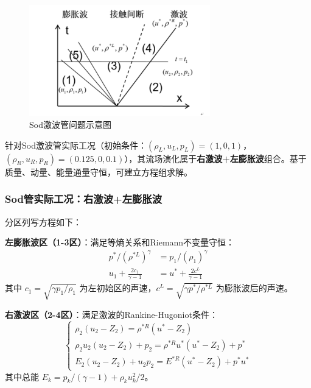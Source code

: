 \documentclass[12pt,a4paper]{article}
\begin{document}
\begin{figure}[H]
    \centering
    \includegraphics[width=0.7\textwidth]{sod_shock_tube.png}
    \caption{Sod激波管问题示意图}
    \label{fig:sod_shock_tube}
\end{figure}
针对Sod激波管实际工况（初始条件：$(\rho_L, u_L, p_L) = (1, 0, 1)$，$(\rho_R, u_R, p_R) = (0.125, 0, 0.1)$），其流场演化属于\textbf{右激波+左膨胀波}组合。基于质量、动量、能量通量守恒，可建立方程组求解。

\subsubsection{Sod管实际工况：右激波+左膨胀波}
分区列写方程如下：

\textbf{左膨胀波区（1-3区）}：满足等熵关系和Riemann不变量守恒：
\begin{align}
p^{*}/\left(\rho^{*L}\right)^{\gamma} &= p_{1}/\left(\rho_{1}\right)^{\gamma} \label{eq:isentropic} \\
u_{1} + \frac{2c_{1}}{\gamma-1} &= u^{*} + \frac{2c^{L}}{\gamma-1} \label{eq:riemann_inv}
\end{align}
其中 $c_{1} = \sqrt{\gamma p_{1}/\rho_{1}}$ 为左初始区的声速，$c^{L} = \sqrt{\gamma p^{*}/\rho^{*L}}$ 为膨胀波后的声速。

\textbf{右激波区（2-4区）}：满足激波的Rankine-Hugoniot条件：
\begin{equation}
\left\{\begin{array}{l}
\rho_{2}\left(u_{2}-Z_{2}\right)=\rho^{*R}\left(u^{*}-Z_{2}\right) \\
\rho_{2}u_{2}\left(u_{2}-Z_{2}\right)+p_{2}=\rho^{*R}u^{*}\left(u^{*}-Z_{2}\right)+p^{*} \\
E_{2}\left(u_{2}-Z_{2}\right)+u_{2}p_{2}=E^{*R}\left(u^{*}-Z_{2}\right)+p^{*}u^{*}
\end{array}\right. \label{eq:rh_shock}
\end{equation}
其中总能 $E_{k} = p_{k}/(\gamma-1) + \rho_{k}u_{k}^{2}/2$。
\end{document}
